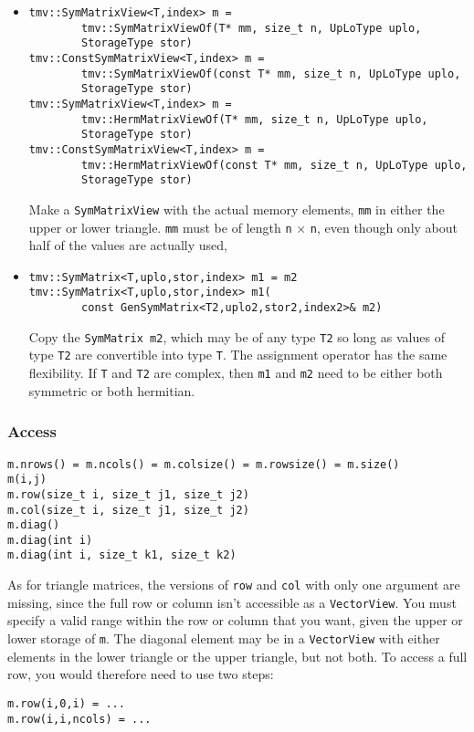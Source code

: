 \documentclass[twoside,letterpaper,11pt]{article}
\renewcommand{\tt}[1]{{\texttt {#1}}}
\begin{document}
\begin{itemize}
\item
\begin{verbatim}
tmv::SymMatrixView<T,index> m = 
        tmv::SymMatrixViewOf(T* mm, size_t n, UpLoType uplo, 
        StorageType stor)
tmv::ConstSymMatrixView<T,index> m = 
        tmv::SymMatrixViewOf(const T* mm, size_t n, UpLoType uplo, 
        StorageType stor)
tmv::SymMatrixView<T,index> m = 
        tmv::HermMatrixViewOf(T* mm, size_t n, UpLoType uplo, 
        StorageType stor)
tmv::ConstSymMatrixView<T,index> m = 
        tmv::HermMatrixViewOf(const T* mm, size_t n, UpLoType uplo, 
        StorageType stor)
\end{verbatim}
Make a \tt{SymMatrixView} with the actual memory elements, \tt{mm} in either the 
upper or lower triangle.
\tt{mm} must be of length \tt{n} $\times$ \tt{n}, even though only about half 
of the values are actually used,

\item
\begin{verbatim}
tmv::SymMatrix<T,uplo,stor,index> m1 = m2
tmv::SymMatrix<T,uplo,stor,index> m1(
        const GenSymMatrix<T2,uplo2,stor2,index2>& m2)
\end{verbatim}
Copy the \tt{SymMatrix m2}, which may be of any type \tt{T2} so long
as values of type \tt{T2} are convertible into type \tt{T}.
The assignment operator has the same flexibility.
If \tt{T} and \tt{T2} are complex, then \tt{m1} and \tt{m2} need to be
either both symmetric or both hermitian.

\end{itemize}

\subsubsection{Access}

\begin{verbatim}
m.nrows() = m.ncols() = m.colsize() = m.rowsize() = m.size()
m(i,j)
m.row(size_t i, size_t j1, size_t j2)
m.col(size_t i, size_t j1, size_t j2)
m.diag()
m.diag(int i)
m.diag(int i, size_t k1, size_t k2)
\end{verbatim}
As for triangle matrices, the versions of \tt{row} and \tt{col} with only one argument are
missing, since the full row or column isn't accessible as a \tt{VectorView}.
You must specify a valid range within the row or column that you want, 
given the upper or lower storage of \tt{m}.
The diagonal element may be in a \tt{VectorView} with either elements in the 
lower triangle or the upper triangle, but not both.  To access a full row, you would 
therefore need to use two steps:
\begin{verbatim}
m.row(i,0,i) = ...
m.row(i,i,ncols) = ...
\end{verbatim}
\end{document}
